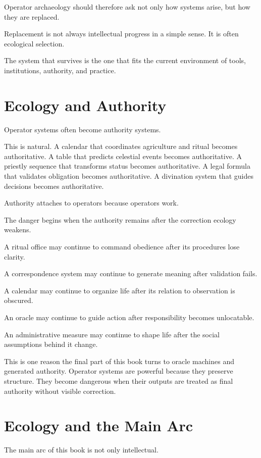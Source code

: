 \documentclass[11pt]{book}
\begin{document}
Operator archaeology should therefore ask not only how systems arise, but how they are replaced.

Replacement is not always intellectual progress in a simple sense. It is often ecological selection.

The system that survives is the one that fits the current environment of tools, institutions, authority, and practice.

\section{Ecology and Authority}

Operator systems often become authority systems.

This is natural. A calendar that coordinates agriculture and ritual becomes authoritative. A table that predicts celestial events becomes authoritative. A priestly sequence that transforms status becomes authoritative. A legal formula that validates obligation becomes authoritative. A divination system that guides decisions becomes authoritative.

Authority attaches to operators because operators work.

The danger begins when the authority remains after the correction ecology weakens.

A ritual office may continue to command obedience after its procedures lose clarity.

A correspondence system may continue to generate meaning after validation fails.

A calendar may continue to organize life after its relation to observation is obscured.

An oracle may continue to guide action after responsibility becomes unlocatable.

An administrative measure may continue to shape life after the social assumptions behind it change.

This is one reason the final part of this book turns to oracle machines and generated authority. Operator systems are powerful because they preserve structure. They become dangerous when their outputs are treated as final authority without visible correction.

\section{Ecology and the Main Arc}

The main arc of this book is not only intellectual.
\end{document}
